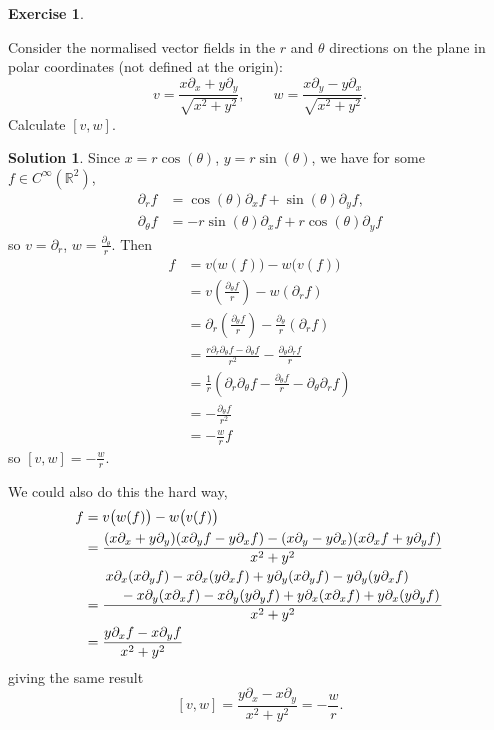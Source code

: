 \documentclass[11pt, a4paper]{report}
\theoremstyle{definition}
\newtheorem{exercise}{Exercise}[part]
\newtheorem{solution}{Solution}[part]
\newenvironment{ex}{\begin{exercise}}{\end{exercise}\pagebreak[1]}
\newenvironment{sol}{\begin{solution}}{\end{solution}\pagebreak[3]}
\begin{document}
\begin{ex}\label{ex:liebracketpolarcoordinates}

Consider the normalised vector fields in the $r$ and $\theta$ directions on the plane in polar coordinates (not defined at the origin):
\[
    v = \frac{x \partial_x + y \partial_y}{\sqrt{x^2 + y^2}}, \qquad
    w = \frac{x \partial_y - y \partial_x}{\sqrt{x^2 + y^2}}.
\]
Calculate $[v, w]$.

\end{ex}

\begin{sol}

Since $x = r \cos(\theta)$, $y = r \sin(\theta)$, we have for some $f \in C^\infty(\mathbb{R}^2)$,
\begin{align*}
    \partial_r f &=\cos(\theta) \partial_x f + \sin(\theta) \partial_y f, \\
    \partial_\theta f &= -r \sin(\theta) \partial_x f + r \cos(\theta) \partial_y f
\end{align*}
so $v = \partial_r$, $w = \frac{\partial_\theta}{r}$.
Then
\allowdisplaybreaks[3]
\begin{align*}
    [v, w]f &= v \bigl( w(f) \bigr) - w \bigl( v(f) \bigr) \\
        &= v\left(\frac{\partial_\theta f}{r}\right) - w(\partial_r f) \\
        &= \partial_r\left(\frac{\partial_\theta f}{r}\right)
            - \frac{\partial_\theta}{r}(\partial_r f) \\
        &= \frac{r \partial_r \partial_\theta f - \partial_\theta f}{r^2}
            - \frac{\partial_\theta \partial_r f}{r} \\
        &= \frac{1}{r} \left(\partial_r \partial_\theta f - \frac{\partial_\theta f}{r}
            - \partial_\theta \partial_r f\right) \\
        &= -\frac{\partial_\theta f}{r^2} \\
        &= -\frac{w}{r} f
\end{align*}
so $[v, w] = -\frac{w}{r}$.
\allowdisplaybreaks[2]

We could also do this the hard way,
\begin{align*}
    [v, w]f &= v \bigl( w(f) \bigr) - w \bigl( v(f) \bigr) \\
        &= \frac{(x \partial_x + y \partial_y)(x \partial_y f - y \partial_x f) - (x \partial_y - y \partial_x)(x \partial_x f + y \partial_y f)}{x^2 + y^2} \\
        &= \frac{\splitdfrac{x \partial_x (x\partial_y f)
                             - x\partial_x(y \partial_x f)
                             + y \partial_y(x\partial_y f)
                             - y \partial_y(y \partial_x f)}
                            {{}-x\partial_y(x\partial_x f)
                             - x\partial_y(y\partial_y f)
                             + y\partial_x(x \partial_x f)
                             + y\partial_x (y \partial_y f)}
                }{x^2 + y^2} \\
        &= \frac{y \partial_x f - x \partial_y f}{x^2 + y^2}
\end{align*}
giving the same result
\[
    [v, w] = \frac{y \partial_x - x \partial_y}{x^2 + y^2} = -\frac{w}{r}.
\]


\end{sol}
\end{document}
